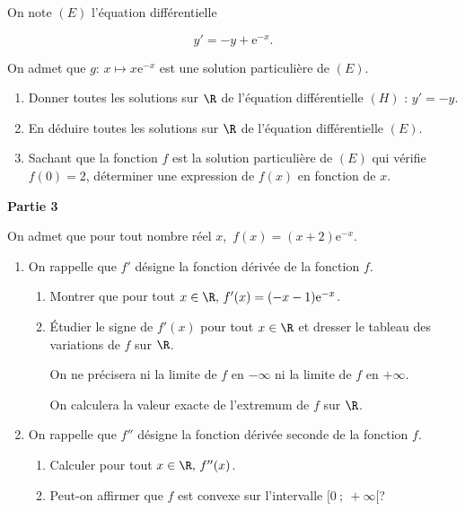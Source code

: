 On note $(E)$ l'équation différentielle 

\[y' = -y + \text{e}^{-x}.\]

On admet que $g :\,  x \longmapsto  x\text{e}^{-x}$ est une solution particulière de $(E)$.

\medskip

\begin{enumerate}
\item Donner toutes les solutions sur $\R$ de l'équation différentielle $(H)$ : 
$y' = -y$.
\item En déduire toutes les solutions sur $\R$ de l'équation différentielle $(E)$.
\item Sachant que la fonction $f$ est la solution particulière de $(E)$ qui vérifie $f(0) = 2$, déterminer une expression de $f(x)$ en fonction de $x$.
\end{enumerate}

\bigskip

\begin{center}\textbf{Partie 3}\end{center}

On admet que pour tout nombre réel $x$,\, $f(x) = (x + 2)\text{e}^{-x}$.

\medskip

\begin{enumerate}
\item On rappelle que $f'$ désigne la fonction dérivée de la fonction $f$.
	\begin{enumerate}
		\item Montrer que pour tout $x \in \R,\, f'(x) = (-x - 1) \text{e}^{-x}$.
		\item Étudier le signe de $f'(x)$ pour tout $x \in \R$ et dresser le tableau des variations de $f$ sur $\R$.

On ne précisera ni la limite de $f$ en $- \infty$ ni la limite de $f$ en $+ \infty$.

On calculera la valeur exacte de l'extremum de $f$ sur $\R$.
	\end{enumerate}
\item On rappelle que $f''$ désigne la fonction dérivée seconde de la fonction $f$.
	\begin{enumerate}
		\item Calculer pour tout $x \in \R,\, f''(x)$.
		\item Peut-on affirmer que $f$ est convexe sur l'intervalle $[0~;~+\infty[$?
	\end{enumerate}
\end{enumerate}

\bigskip

